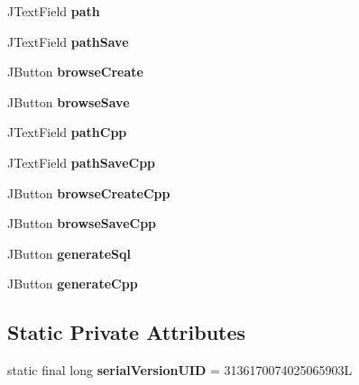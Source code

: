 \begin{DoxyCompactItemize}
\item 
\hypertarget{class_gui_abf9b5a841035e2537d8d727077e3eab5}{
JTextField {\bfseries path}}
\label{class_gui_abf9b5a841035e2537d8d727077e3eab5}

\item 
\hypertarget{class_gui_a28856c57d3cbd54d1f123ec4f862137e}{
JTextField {\bfseries pathSave}}
\label{class_gui_a28856c57d3cbd54d1f123ec4f862137e}

\item 
\hypertarget{class_gui_ae100d84327639fd3a07d6d65acbfc3b6}{
JButton {\bfseries browseCreate}}
\label{class_gui_ae100d84327639fd3a07d6d65acbfc3b6}

\item 
\hypertarget{class_gui_a59c69933994687305094ea9fb3e40931}{
JButton {\bfseries browseSave}}
\label{class_gui_a59c69933994687305094ea9fb3e40931}

\item 
\hypertarget{class_gui_a49e9f4b9779294c91a7f3209c0152b82}{
JTextField {\bfseries pathCpp}}
\label{class_gui_a49e9f4b9779294c91a7f3209c0152b82}

\item 
\hypertarget{class_gui_a5baadbb70adf80d5cb8ccfb9d498eb8b}{
JTextField {\bfseries pathSaveCpp}}
\label{class_gui_a5baadbb70adf80d5cb8ccfb9d498eb8b}

\item 
\hypertarget{class_gui_a79c6d4e199f7a447f427c0633a3f02ef}{
JButton {\bfseries browseCreateCpp}}
\label{class_gui_a79c6d4e199f7a447f427c0633a3f02ef}

\item 
\hypertarget{class_gui_a513530f4cbed6c1ce699f9288eeea7f6}{
JButton {\bfseries browseSaveCpp}}
\label{class_gui_a513530f4cbed6c1ce699f9288eeea7f6}

\item 
\hypertarget{class_gui_ade0f8b5091ab64dcc6aa8f820a7b896c}{
JButton {\bfseries generateSql}}
\label{class_gui_ade0f8b5091ab64dcc6aa8f820a7b896c}

\item 
\hypertarget{class_gui_a29026ae7961f468914f48bdbe262dab5}{
JButton {\bfseries generateCpp}}
\label{class_gui_a29026ae7961f468914f48bdbe262dab5}

\end{DoxyCompactItemize}
\subsection*{Static Private Attributes}
\begin{DoxyCompactItemize}
\item 
\hypertarget{class_gui_a22fc51f45d6e9af37db2f47b53d125d2}{
static final long {\bfseries serialVersionUID} = 3136170074025065903L}
\label{class_gui_a22fc51f45d6e9af37db2f47b53d125d2}

\end{DoxyCompactItemize}


